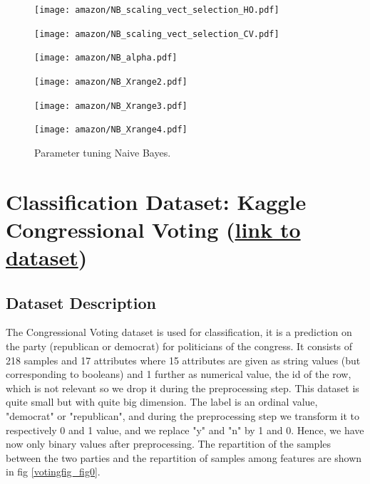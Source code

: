 \documentclass[11pt]{article}
\begin{document}
\begin{figure}[h]
\begin{minipage}[t]{0.33\textwidth}
\texttt{[image: amazon/NB\_scaling\_vect\_selection\_HO.pdf]}
\end{minipage}
\begin{minipage}[t]{0.33\textwidth}
\texttt{[image: amazon/NB\_scaling\_vect\_selection\_CV.pdf]}
\end{minipage}
\begin{minipage}[t]{0.33\textwidth}
\texttt{[image: amazon/NB\_alpha.pdf]}
\end{minipage}
\begin{minipage}[t]{0.33\textwidth}
\texttt{[image: amazon/NB\_Xrange2.pdf]}
\end{minipage}
\begin{minipage}[t]{0.33\textwidth}
\texttt{[image: amazon/NB\_Xrange3.pdf]}
\end{minipage}
\begin{minipage}[t]{0.33\textwidth}
\texttt{[image: amazon/NB\_Xrange4.pdf]}
\end{minipage}
\caption{Parameter tuning Naive Bayes.}
\label{Fig::Naive Bayes parameter tuning}
\end{figure}

\section{Classification Dataset: Kaggle Congressional Voting (\href{https://www.kaggle.com/c/184702-tu-ml-ss-21-congressional-voting/overview}{link to dataset})}

\subsection{Dataset Description}
The Congressional Voting dataset is used for classification, it is a prediction on the party (republican or democrat) for politicians of the congress. It consists of 218 samples and 17 attributes where 15 attributes are given as string values (but corresponding to booleans) and 1 further as numerical value, the id of the row, which is not relevant so we drop it during the preprocessing step. This dataset is quite small but with quite big dimension. 
The label is an ordinal value, "democrat" or "republican", and during the preprocessing step we transform it to respectively 0 and 1 value, and we replace "y" and "n" by 1 and 0. Hence, we have now only binary values after preprocessing. The repartition of the samples between the two parties and the repartition of samples among features are shown in fig  \ref{votingfig_fig0}.
\end{document}
